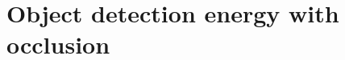 \begin{comment}
    L_u(\mathbf{u}, \mu^i_u,\Sigma^i_u) &= \frac{1}{
      1 + e^{-k_u(1 - (\mathbf{u} - \mu^i_u)^\top\Sigma^i_u(\mathbf{u} -
      \mu^i_u))}
    }
    \\
    L_{\lambda}(\mathbf{u}, \lambda; \mu^i_d) &= \frac{1}{
    1 + e^{-k_d(\lambda - \mu^i_d(\mathbf{u}))}
  }
  \end{align}
  where 
  \begin{align}
    \mu_u^i &= \projectionOf{\pos{i}{t-1}} \label{eq:muiudef}\\
    \Sigma_u^i &= \projectionOf{\Sigma_i} \label{eq:sigmauidef}\\
    \mu^i_d(\mathbf{u}) &= \relp{i}{t}\\
    k_u &= 10\log(49)\\
    k_d &= \frac{\log(49)}{\sqrt{h^2 + l^2 + w^2}}
    \label{eq:ptransmissionInit}
  \end{align}
  is the distance of the centre of the TP from the camera.


  The association probability becomes

  \begin{multline}
    \assocP = 
      \sech^4\left(\frac{k}{2}\dishort\right)
      (\max \{ 0, \nabla k\dishort^\top\ray \})^2\\
    \prod_i \Lu
      \Llambda \\
      \label{eq:assocCoeffEval}
  \end{multline}

  So the energy becomes

  \begin{multline}
    \label{eq:integrand}
    \Energy{track}(.) = 
      \sum_{i = 1}^N
      \sum_{j = 1}^{M}
      \int_1^{\infty}
      \assocP
      \Ereproj(\lambda)
      d\lambda
  \end{multline}
  where $x = \lambda \ray$ and $\Ereproj(\lambda) = \|\trackpj{t} -
  f^i_{reproj}(\trackpj{t-1}, \lambda)\|^2$ is reprojection error which is a
  quadratic in $\lambda$

  The integral in the above expression is computed numerically.
\end{comment}

\section{Object detection energy with occlusion} 

